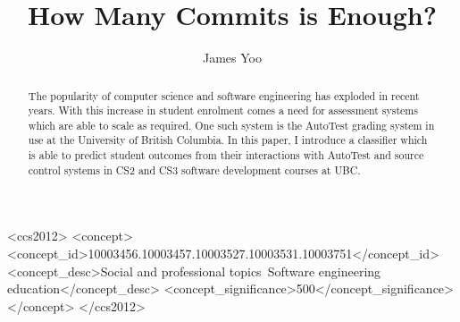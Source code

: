 \documentclass[sigchi]{acmart}
\begin{document}
\title{How Many Commits is Enough?}

\author{James Yoo}



\begin{abstract}
The popularity of computer science and software engineering has exploded in recent years. With this increase in student enrolment comes a need for assessment systems which are able to scale as required. One such system is the AutoTest grading system in use at the University of British Columbia. In this paper, I introduce a classifier which is able to predict student outcomes from their interactions with AutoTest and source control systems in CS2 and CS3 software development courses at UBC.
\end{abstract}

\begin{CCSXML}
<ccs2012>
<concept>
<concept_id>10003456.10003457.10003527.10003531.10003751</concept_id>
<concept_desc>Social and professional topics~Software engineering education</concept_desc>
<concept_significance>500</concept_significance>
</concept>
</ccs2012>
\end{CCSXML}


\end{document}
